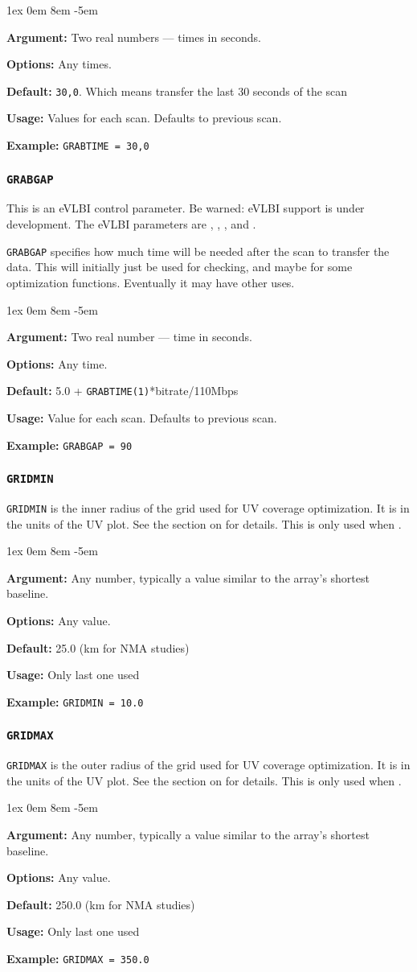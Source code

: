 \documentclass{report}
\newcommand{\rcwbox}[5]{
  \begin{list}{}{\parsep 1ex  \itemsep 0em
                 \leftmargin 8em  \itemindent -5em }
    \item {\bf Argument:} #1
    \item {\bf Options:}  #2
    \item {\bf Default:}  #3
    \item {\bf Usage:}    #4
    \item {\bf Example:}  #5
  \end{list}
}
\begin{document}
\rcwbox
{ Two real numbers --- times in seconds.}
{ Any times.}
{{\tt 30,0}.  Which means transfer the last 30 seconds of the scan}
{Values for each scan.  Defaults to previous scan.}
{{\tt GRABTIME = 30,0 }}


\subsubsection{\label{MP:GRABGAP}{\tt GRABGAP}}

This is an eVLBI control parameter.  Be warned: eVLBI support is
under development.
The eVLBI parameters are ,
, ,
and .

{\tt GRABGAP} specifies how much time will be needed after the
scan to transfer the data.  This will initially just be used for
checking, and maybe for some optimization functions.  Eventually
it may have other uses.

\rcwbox
{ Two real number --- time in seconds.}
{ Any time.}
{5.0 + {\tt GRABTIME(1)}*bitrate/110Mbps}
{Value for each scan.  Defaults to previous scan.}
{{\tt GRABGAP = 90 }}

\subsubsection{\label{MP:GRIDMIN}{\tt GRIDMIN}}

{\tt GRIDMIN} is the inner radius of the grid used for UV
coverage optimization.  It is in the units of the UV plot.
See the section on  for details.  This is only used when
.

\rcwbox
{Any number, typically a value similar to the array's shortest baseline.}
{Any value.}
{25.0 (km for NMA studies)}
{Only last one used}
{{\tt GRIDMIN = 10.0}}

\subsubsection{\label{MP:GRIDMAX}{\tt GRIDMAX}}

{\tt GRIDMAX} is the outer radius of the grid used for UV
coverage optimization.  It is in the units of the UV plot.
See the section on  for details.  This is only used when
.

\rcwbox
{Any number, typically a value similar to the array's shortest baseline.}
{Any value.}
{250.0 (km for NMA studies)}
{Only last one used}
{{\tt GRIDMAX = 350.0}}
\end{document}
